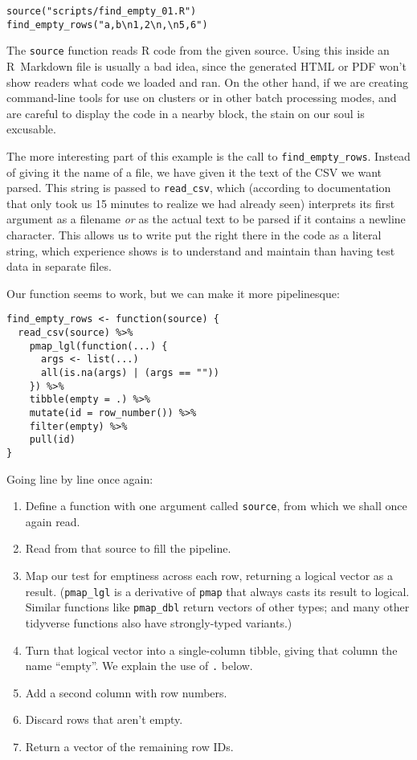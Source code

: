\begin{lstlisting}
source("scripts/find_empty_01.R")
find_empty_rows("a,b\n1,2\n,\n5,6")
\end{lstlisting}

The \texttt{source} function reads R code from the given source.
Using this inside an R~Markdown file is usually a bad idea,
since the generated HTML or PDF won't show readers what code we loaded and ran.
On the other hand,
if we are creating command-line tools for use on clusters or in other batch processing modes,
and are careful to display the code in a nearby block,
the stain on our soul is excusable.

The more interesting part of this example is the call to \texttt{find\_empty\_rows}.
Instead of giving it the name of a file,
we have given it the text of the CSV we want parsed.
This string is passed to \texttt{read\_csv},
which (according to documentation that only took us 15 minutes to realize we had already seen)
interprets its first argument as a filename \emph{or}
as the actual text to be parsed if it contains a newline character.
This allows us to write put the 
right there in the code as a literal string,
which experience shows is to understand and maintain
than having test data in separate files.

Our function seems to work,
but we can make it more pipelinesque:

\begin{lstlisting}
find_empty_rows <- function(source) {
  read_csv(source) %>%
    pmap_lgl(function(...) {
      args <- list(...)
      all(is.na(args) | (args == ""))
    }) %>%
    tibble(empty = .) %>%
    mutate(id = row_number()) %>%
    filter(empty) %>%
    pull(id)
}
\end{lstlisting}

\noindent
Going line by line once again:

\begin{enumerate}
\item
  Define a function with one argument called \texttt{source}, from which we shall once again read.
\item
  Read from that source to fill the pipeline.
\item
  Map our test for emptiness across each row, returning a logical vector as a result.
  (\texttt{pmap\_lgl} is a derivative of \texttt{pmap} that always casts its result to logical.
  Similar functions like \texttt{pmap\_dbl} return vectors of other types;
  and many other tidyverse functions also have strongly-typed variants.)
\item
  Turn that logical vector into a single-column tibble,
  giving that column the name ``empty''.
  We explain the use of \texttt{.} below.
\item
  Add a second column with row numbers.
\item
  Discard rows that aren't empty.
\item
  Return a vector of the remaining row IDs.
\end{enumerate}

